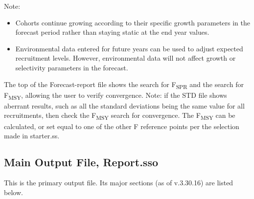 Note:
\begin{itemize}
	\item Cohorts continue growing according to their specific growth parameters in the forecast period rather than staying static at the end year values.
	\item Environmental data entered for future years can be used to adjust expected recruitment levels. However, environmental data will not affect growth or selectivity parameters in the forecast.
\end{itemize}

The top of the Forecast-report file shows the search for F\textsubscript {SPR}  and the search for F\textsubscript {MSY}, allowing the user to verify convergence. Note: if the STD file shows aberrant results, such as all the standard deviations being the same value for all recruitments, then check the F\textsubscript {MSY} search for convergence. The F\textsubscript {MSY} can be calculated, or set equal to one of the other F reference points per the selection made in starter.ss.


\subsection{Main Output File, Report.sso}
This is the primary output file. Its major sections (as of v.3.30.16) are listed below.  

